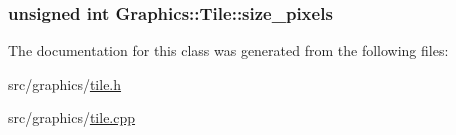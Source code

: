 \subsubsection[{size\+\_\+pixels}]{\setlength{\rightskip}{0pt plus 5cm}unsigned int Graphics\+::\+Tile\+::size\+\_\+pixels\hspace{0.3cm}{\ttfamily [private]}}\label{class_graphics_1_1_tile_a7524ad0a888622408b2447c70c4bbc86}


The documentation for this class was generated from the following files\+:\begin{DoxyCompactItemize}
\item 
src/graphics/\hyperlink{tile_8h}{tile.\+h}\item 
src/graphics/\hyperlink{tile_8cpp}{tile.\+cpp}\end{DoxyCompactItemize}
